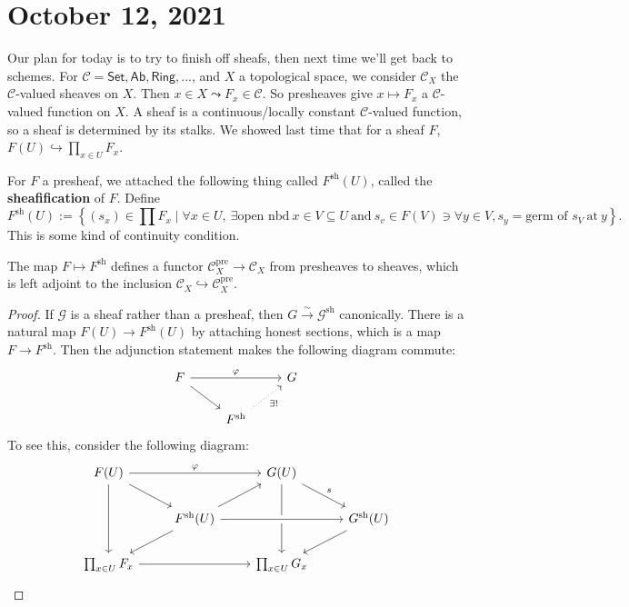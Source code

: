 \section{October 12, 2021} 
Our plan for today is to try to finish off sheafs, then next time we'll get back to schemes. For $\mathcal{C} =\mathsf{Set} ,\mathsf{Ab} ,\mathsf{Ring} , . . .$, and $X$ a topological space, we consider $\mathcal{C} _X$ the $\mathcal{C} $-valued sheaves on $X$. Then $x \in X \leadsto F_x \in \mathcal{C} $. So presheaves give $x \mapsto F_x$ a $\mathcal{C} $-valued function on $X$. A sheaf is a continuous/locally constant $\mathcal{C} $-valued function, so a sheaf is determined by its stalks. We showed last time that for a sheaf $F$, $F(U) \hookrightarrow  \prod _{x \in U}F_x$.

For $F$ a presheaf, we attached the following thing called $F ^{\mathrm{sh}}(U)$, called the \textbf{sheafification} of $F$. Define \[
    F ^{\mathrm{sh}}(U) := \left\{ (s_x) \in \prod F_x \mid \forall x \in U, \ \exists \text{open nbd} \ x \in V \subseteq U \ \text{and} \ s_v \in F(V) \ni \forall y \in V,s_y= \text{germ of } s_V \ \text{at} \ y\right\} .
\] This is some kind of continuity condition.
\begin{theorem}
    The map $F \mapsto  F^{\mathrm{sh}}$ defines a functor $\mathcal{C} _X ^{\mathrm{pre}}\to \mathcal{C} _X$ from presheaves to sheaves, which is left adjoint to the inclusion $\mathcal{C} _X \hookrightarrow  \mathcal{C} _X ^{\mathrm{pre}}$.
\end{theorem}
\begin{proof}
If $\mathcal{G} $ is a sheaf rather than a presheaf, then $G \xrightarrow{\sim} \mathcal{G} ^{\mathrm{sh}}$ canonically. There is a natural map $F(U) \to F^{\mathrm{sh}}(U)$ by attaching honest sections, which is a map $F \to F ^{\mathrm{sh}}$. Then the adjunction statement makes the following diagram commute: \[
\begin{tikzcd}
F \arrow[rr, "\varphi"] \arrow[rd] &                                                  & G \\
                                   & F^{\mathrm{sh}} \arrow[ru, "\exists !"', dotted] &  
\end{tikzcd}
\] To see this, consider the following diagram: \[
\begin{tikzcd}
F(U) \arrow[rr, "\varphi"] \arrow[rd] \arrow[dd] &                                                     & G(U) \arrow[rd, "s"] \arrow[dd] &                               \\
                                                 & F^{\mathrm{sh}}(U) \arrow[ld] \arrow[ru] \arrow[rr, crossing over] &                                 & G^{\mathrm{sh}}(U) \arrow[ld] \\
\prod_{x\in U} F_x \arrow[rr]                    &                                                     & \prod_{x\in U}G_x               &                              
\end{tikzcd}
\] 
\end{proof}
